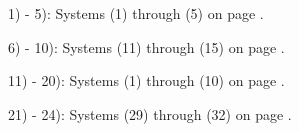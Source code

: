 \documentclass[12pt]{book}
\theoremstyle{definition}
\begin{document}
1) - 5): Systems (1) through (5) on page \pageref{matrices1}.\par

6) - 10): Systems (11) through (15) on page \pageref{matrices1}.\par

11) - 20): Systems (1) through (10) on page \pageref{matrices2}.\par

21) - 24): Systems (29) through (32) on page \pageref{matrices3}.
\newpage
\end{document}
